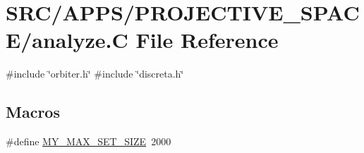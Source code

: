 \hypertarget{analyze_8_c}{}\section{S\+R\+C/\+A\+P\+P\+S/\+P\+R\+O\+J\+E\+C\+T\+I\+V\+E\+\_\+\+S\+P\+A\+C\+E/analyze.C File Reference}
\label{analyze_8_c}
{\ttfamily \#include \char`\"{}orbiter.\+h\char`\"{}}\newline
{\ttfamily \#include \char`\"{}discreta.\+h\char`\"{}}\newline
\subsection*{Macros}
\begin{DoxyCompactItemize}
\item 
\#define \mbox{\hyperlink{analyze_8_c_a1aea137e637de21dfaed317cd0d1f949}{M\+Y\+\_\+\+M\+A\+X\+\_\+\+S\+E\+T\+\_\+\+S\+I\+ZE}}~2000
\end{DoxyCompactItemize}
